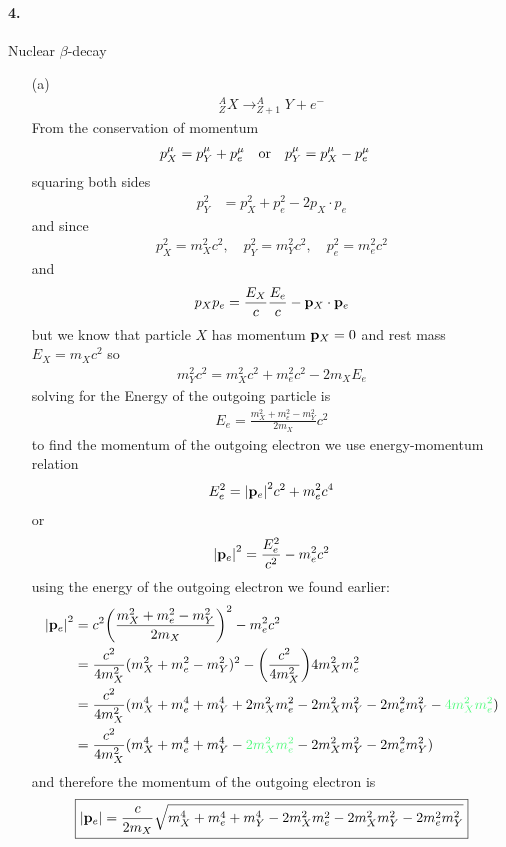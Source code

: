 \documentclass[../main.tex]{subfiles}
\begin{document}
\paragraph{4.} Nuclear $\beta$-decay
\begin{itemize}
    \item [(a)]
\begin{align*}
    _Z^A X \rightarrow _{Z+1}^A Y + e^-
\end{align*}
From the conservation of momentum
\begin{align*}
    p^\mu_X &= p^\mu_Y + p^\mu_e \qor p^\mu_Y = p^\mu_X - p^\mu_e
\end{align*}
squaring both sides
\begin{align*}
    p^2_Y &= p^2_X + p^2_e - 2p_X \cdot p_e
\end{align*}
and since
\begin{align*}
    p^2_X = m_X^2 c^2, \quad
    p^2_Y = m_Y^2 c^2, \quad p^2_e = m_e^2 c^2
\end{align*}
and
\begin{align*}
    p_X p_e = \frac{E_X}{c} \frac{E_e}{c} - \vb{p}_X \cdot \vb{p}_e
\end{align*}
but we know that particle $X$ has momentum $\vb{p}_X = 0$ and rest mass $E_X = m_X c^2$ so
\begin{align*}
    m_Y^2 c^2 = m_X^2 c^2 + m_e^2 c^2 - 2 m_X E_e
\end{align*}
solving for the Energy of the outgoing particle is
\begin{align*}
    \boxed{E_e = \frac{m_X^2 + m_e^2 - m_Y^2}{2 m_X} c^2}
\end{align*}
to find the momentum of the outgoing electron we use energy-momentum relation
\begin{align*}
    E_e^2 = \abs{\vb{p}_e}^2 c^2 + m_e^2 c^4
\end{align*}
or
\begin{align*}
    \abs{\vb{p}_e}^2 = \frac{E_e^2}{c^2} - m_e^2 c^2
\end{align*}
using the energy of the outgoing electron we found earlier:
\begin{align*}
    \abs{\vb{p}_e}^2 &= c^2 \qt(\frac{m_X^2 + m_e^2 - m_Y^2}{2 m_X})^2 - m_e^2 c^2 \\
    &= \frac{c^2}{4 m_X^2} (m_X^2 + m_e^2 - m_Y^2)^2 - \qt(\frac{c^2}{4m_X^2}) 4m_X^2 m_e^2 \\
    &= \frac{c^2}{4m_X^2} (m_X^4 + m_e^4 + m_Y^4 + 2 m_X^2 m_e^2 - 2 m_X^2 m_Y^2 - 2 m_e^2 m_Y^2 -
    \mathcolor{draculagreen}{4m_X^2 m_e^2})\\
    &= \frac{c^2}{4m_X^2} (m_X^4 + m_e^4 + m_Y^4 - \mathcolor{draculagreen}{2 m_X^2 m_e^2}
    - 2 m_X^2 m_Y^2 - 2 m_e^2 m_Y^2) \\
\end{align*}
and therefore the momentum of the outgoing electron is
\begin{align*}
\boxed{
    \abs{\vb{p}_e} = \frac{c}{2m_X} \sqrt{m_X^4 + m_e^4 + m_Y^4 - 2 m_X^2 m_e^2 - 2 m_X^2 m_Y^2
    - 2 m_e^2 m_Y^2}
}
\end{align*}


\end{itemize}
\end{document}
